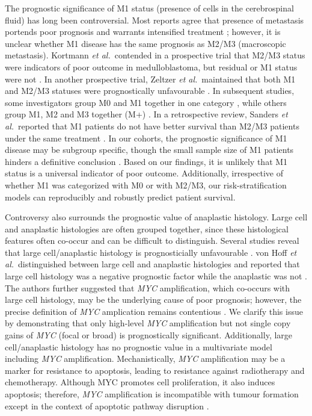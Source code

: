 The prognostic significance of M1 status (presence of cells in the cerebrospinal fluid) has long been controversial. Most reports agree that presence of metastasis portends poor prognosis and warrants intensified treatment ; however, it is unclear whether M1 disease has the same prognosis as M2/M3 (macroscopic metastasis). Kortmann \emph{et al.}\ contended in a prospective trial that M2/M3 status were indicators of poor outcome in medulloblastoma, but residual or M1 status were not . In another prospective trial, Zeltzer \emph{et al.}\ maintained that both M1 and M2/M3 statuses were prognostically unfavourable . In subsequent studies, some investigators group M0 and M1 together in one category , while others group M1, M2 and M3 together (M+) . In a retrospective review, Sanders \emph{et al.}\ reported that M1 patients do not have better survival than M2/M3 patients under the same treatment . In our cohorts, the prognostic significance of M1 disease may be subgroup specific, though the small sample size of M1 patients hinders a definitive conclusion . Based on our findings, it is unlikely that M1 status is a universal indicator of poor outcome. Additionally, irrespective of whether M1 was categorized with M0 or with M2/M3, our risk-stratification models can reproducibly and robustly predict patient survival.

Controversy also surrounds the prognostic value of anaplastic histology. Large cell and anaplastic histologies are often grouped together, since these histological features often co-occur and can be difficult to distinguish. Several studies reveal that large cell/anaplastic histology is prognosticially unfavourable . von Hoff \emph{et al.}\ distinguished between large cell and anaplastic histologies and reported that large cell histology was a negative prognostic factor while the anaplastic was not . The authors further suggested that \emph{MYC} amplification, which co-occurs with large cell histology, may be the underlying cause of poor prognosis; however, the precise definition of \emph{MYC} amplication remains contentious . We clarify this issue by demonstrating that only high-level \emph{MYC} amplification but not single copy gains of \emph{MYC} (focal or broad) is prognostically significant. Additionally, large cell/anaplastic histology has no prognostic value in a multivariate model including \emph{MYC} amplification. Mechanistically, \emph{MYC} amplification may be a marker for resistance to apoptosis, leading to resistance against radiotherapy and chemotherapy. Although MYC promotes cell proliferation, it also induces apoptosis; therefore, \emph{MYC} amplification is incompatible with tumour formation except in the context of apoptotic pathway disruption .

